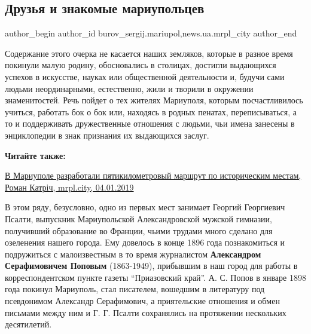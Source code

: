  
 
 
 
 
 
\subsection{Друзья и знакомые мариупольцев}
\label{sec:05_01_2019.stz.news.ua.mrpl_city.1.druzja_i_znakomye_mariupolcev}
 
\ifcmt
 author_begin
   author_id burov_sergij.mariupol,news.ua.mrpl_city
 author_end
\fi


Содержание этого очерка не касается наших земляков, которые в разное время
покинули малую родину, обосновались в столицах, достигли выдающихся успехов в
искусстве, науках или общественной деятельности и, будучи сами людьми
неординарными, естественно, жили и творили в окружении знаменитостей. Речь
пойдет о тех жителях Мариуполя, которым посчастливилось учиться, работать бок о
бок или, находясь в родных пенатах, переписываться, а то и поддерживать
дружественные отношения с людьми, чьи имена занесены в энциклопедии в знак
признания их выдающихся заслуг.

\vspace{0.5cm}
\begin{minipage}{0.9\textwidth}
\textbf{Читайте также:}

\href{https://mrpl.city/news/view/v-mariupole-razrabotali-pyatikilometrovyj-marshrut-po-istoricheskim-mestam-foto}{%
В Мариуполе разработали пятикилометровый маршрут по историческим местам, Роман Катріч, mrpl.city, 04.01.2019}
\end{minipage}
\vspace{0.5cm}

В этом ряду, безусловно, одно из первых мест занимает Георгий Георгиевич
Псалти, выпускник Мариупольской Александровской мужской гимназии, получивший
образование во Франции, чьими трудами много сделано для озеленения нашего
города. Ему довелось в конце 1896 года познакомиться и подружиться с
малоизвестным в то время журналистом \textbf{Александром Серафимовичем Поповым}
(1863-1949), прибывшим в наш город для работы в корреспондентском пункте газеты
\enquote{Приазовский край}. А. С. Попов в январе 1898 года покинул Мариуполь, стал
писателем, вошедшим в литературу под псевдонимом Александр Серафимович, а
приятельские отношения и обмен письмами между ним и Г. Г. Псалти сохранялись на
протяжении нескольких десятилетий.

